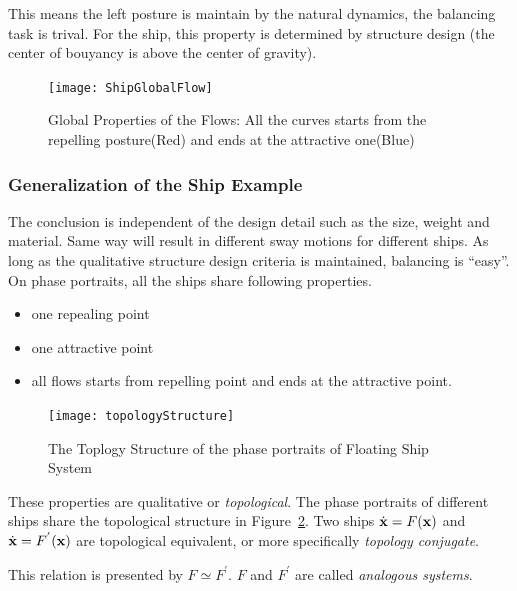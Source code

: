 This means the left posture is maintain by the natural dynamics, the balancing task is trival.
For the ship, this property is determined by structure design (the center of bouyancy is above the center of gravity).

\begin{figure}[!htbp]
  \begin{center}
   \texttt{[image: ShipGlobalFlow]}
   \caption{Global Properties of the Flows: All the curves starts from the repelling posture(Red) and ends at the attractive one(Blue)}
   \label{fig:globalflow}
  \end{center}
\end{figure}

 



\subsubsection*{Generalization of the Ship Example} 
The conclusion is independent of the design detail such as the size, weight and material. 
Same way will result in different sway motions for different ships.
As long as the qualitative structure design criteria is maintained, balancing is ``easy''.
On phase portraits,  all the ships share following properties. 
\begin{itemize}
\item one repealing point 
\item one attractive point 
\item all flows starts from repelling point and ends at the  attractive point. 
\end{itemize}


\begin{figure}[!htbp]
  \begin{center}
   \texttt{[image: topologyStructure]}
   \caption{The Toplogy Structure of the phase portraits of Floating Ship System}
   \label{fig:topologyStructure}
  \end{center}
\end{figure}



These properties are qualitative or \emph{topological}.
The phase portraits of different ships share the topological structure in Figure~\ref{fig:topologyStructure}.
Two ships  $\dot{\mathbf{x}}=F(\mathbf{x})$ and $\dot{\mathbf{x}}=F^{'}(\mathbf{x})$ are topological equivalent, or more specifically \emph{topology conjugate}.

This relation is presented by $F \simeq F^{'}$.
$F$ and $F^{'}$ are called \emph{analogous systems}.


